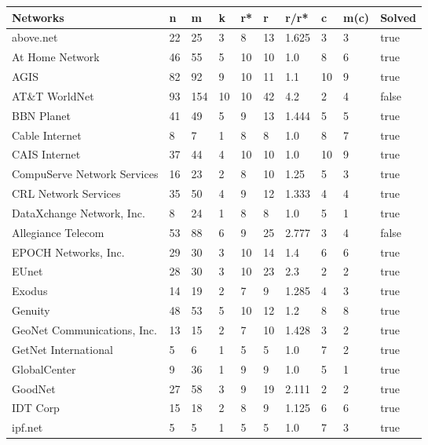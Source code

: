 \documentclass [12pt]{article}
\begin{document}
\thispagestyle{empty}
\begin{table}[H]
  \begin{tabular}{ | l | l | l | l | l | l | l | l | l | l |  }
    \hline
    Networks & n & m & k & r* & r & r/r* & c & m(c) & Solved\\ \hline
    above.net & 22 & 25 & 3 & 8 & 13 & 1.625 & 3 & 3 & true\\ \hline
    At Home Network & 46 & 55 & 5 & 10 & 10 & 1.0 & 8 & 6 & true\\ \hline
    AGIS & 82 & 92 & 9 & 10 & 11 & 1.1 & 10 & 9 & true\\ \hline
    AT\&T WorldNet & 93 & 154 & 10 & 10 & 42 & 4.2 & 2 & 4 & false\\ \hline
    BBN Planet & 41 & 49 & 5 & 9 & 13 & 1.444 & 5 & 5 & true\\ \hline
    Cable Internet & 8 & 7 & 1 & 8 & 8 & 1.0 & 8 & 7 & true\\ \hline
    CAIS Internet & 37 & 44 & 4 & 10 & 10 & 1.0 & 10 & 9 & true\\ \hline
    CompuServe Network Services & 16 & 23 & 2 & 8 & 10 & 1.25 & 5 & 3 & true\\ \hline
    CRL Network Services & 35 & 50 & 4 & 9 & 12 & 1.333 & 4 & 4 & true\\ \hline
    DataXchange Network, Inc. & 8 & 24 & 1 & 8 & 8 & 1.0 & 5 & 1 & true\\ \hline
    Allegiance Telecom & 53 & 88 & 6 & 9 & 25 & 2.777 & 3 & 4 & false\\ \hline
    EPOCH Networks, Inc. & 29 & 30 & 3 & 10 & 14 & 1.4 & 6 & 6 & true\\ \hline
    EUnet & 28 & 30 & 3 & 10 & 23 & 2.3 & 2 & 2 & true\\ \hline
    Exodus & 14 & 19 & 2 & 7 & 9 & 1.285 & 4 & 3 & true\\ \hline
    Genuity & 48 & 53 & 5 & 10 & 12 & 1.2 & 8 & 8 & true\\ \hline
    GeoNet Communications, Inc. & 13 & 15 & 2 & 7 & 10 & 1.428 & 3 & 2 & true\\ \hline
    GetNet International & 5 & 6 & 1 & 5 & 5 & 1.0 & 7 & 2 & true\\ \hline
    GlobalCenter & 9 & 36 & 1 & 9 & 9 & 1.0 & 5 & 1 & true\\ \hline
    GoodNet & 27 & 58 & 3 & 9 & 19 & 2.111 & 2 & 2 & true\\ \hline
    IDT Corp & 15 & 18 & 2 & 8 & 9 & 1.125 & 6 & 6 & true\\ \hline
    ipf.net & 5 & 5 & 1 & 5 & 5 & 1.0 & 7 & 3 & true\\ \hline

\end{tabular}
\end{table}
\end{document}
